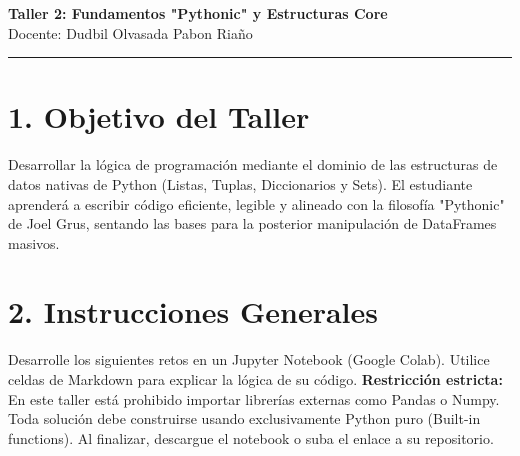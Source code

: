 \documentclass[12pt,a4paper]{article}
\begin{document}
\begin{center}
    {\huge \textcolor{unabblue}{\textbf{Taller 2: Fundamentos "Pythonic" y Estructuras Core}}} \\[0.5cm]
    {\large Docente: Dudbil Olvasada Pabon Riaño} \\[0.2cm]
    \rule{\textwidth}{1pt}
\end{center}

\vspace{0.5cm}

\section*{\textcolor{unabblue}{1. Objetivo del Taller}}
Desarrollar la lógica de programación mediante el dominio de las estructuras de datos nativas de Python (Listas, Tuplas, Diccionarios y Sets). El estudiante aprenderá a escribir código eficiente, legible y alineado con la filosofía "Pythonic" de Joel Grus, sentando las bases para la posterior manipulación de DataFrames masivos.

\section*{\textcolor{unabblue}{2. Instrucciones Generales}}
Desarrolle los siguientes retos en un Jupyter Notebook (Google Colab). Utilice celdas de Markdown para explicar la lógica de su código. \textbf{Restricción estricta:} En este taller está prohibido importar librerías externas como Pandas o Numpy. Toda solución debe construirse usando exclusivamente Python puro (Built-in functions). Al finalizar, descargue el notebook o suba el enlace a su repositorio.

\vspace{0.5cm}
\noindent{}
\vspace{0.5cm}
\end{document}
